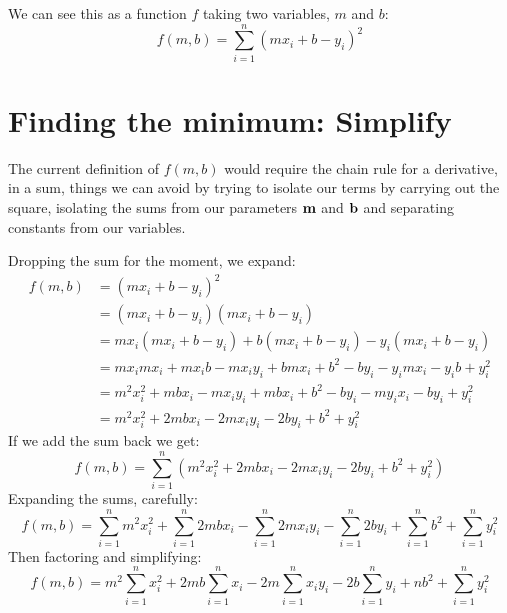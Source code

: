 \documentclass{article}
\begin{document}
We can see this as a function $f$ taking two variables, $m$ and $b$:
\begin{equation}
f(m, b) = \sum_{i=1}^{n}\left(m x_i + b - y_i\right)^2
\end{equation}


\section{Finding the minimum: Simplify}

The current definition of $f(m, b)$ would require the chain rule for a
derivative, in a sum, things we can avoid by trying to isolate our terms
by carrying out the square, isolating the sums from our parameters ${\bf m}$
and ${\bf b}$ and separating constants from our variables.

Dropping the sum for the moment, we expand:
\begin{equation}
\begin{split}
f(m, b) & = \left(m x_i + b - y_i\right)^2\\
 & = \left(m x_i + b - y_i\right)\left(m x_i + b - y_i\right)\\
 & = m x_i \left(m x_i + b - y_i\right) + b \left(m x_i + b - y_i\right) - y_i \left(m x_i + b - y_i\right) \\
 & = m x_i m x_i + m x_i b - m x_i y_i + b m x_i + b^2 - b y_i - y_i m x_i - y_i b + y_i^2 \\
 & = m^2 x_i^2 + m b x_i  - m x_i y_i + m b x_i + b^2 - b y_i - m y_i x_i - b y_i + y_i^2 \\
 & = m^2 x_i^2 + 2 m b x_i  - 2 m x_i y_i - 2 b y_i + b^2 + y_i^2 
\end{split}
\end{equation}
If we add the sum back we get:
\begin{equation}
f(m, b) = \sum_{i=1}^n \left( m^2 x_i^2 + 2 m b x_i  - 2 m x_i y_i - 2 b y_i + b^2 + y_i^2 \right)
\end{equation}
Expanding the sums, carefully:
\begin{equation}
f(m, b) = \sum_{i=1}^n m^2 x_i^2 + \sum_{i=1}^n 2 m b x_i  - \sum_{i=1}^n 2 m x_i y_i - \sum_{i=1}^n 2 b y_i + \sum_{i=1}^n b^2 + \sum_{i=1}^n y_i^2 
\end{equation}
Then factoring and simplifying:
\begin{equation}
\label{biggun}
f(m, b) = m^2 \sum_{i=1}^n x_i^2 + 2 m b \sum_{i=1}^n  x_i  - 2 m \sum_{i=1}^n x_i y_i - 2 b \sum_{i=1}^n y_i + n b^2 + \sum_{i=1}^n y_i^2 
\end{equation}
\end{document}
